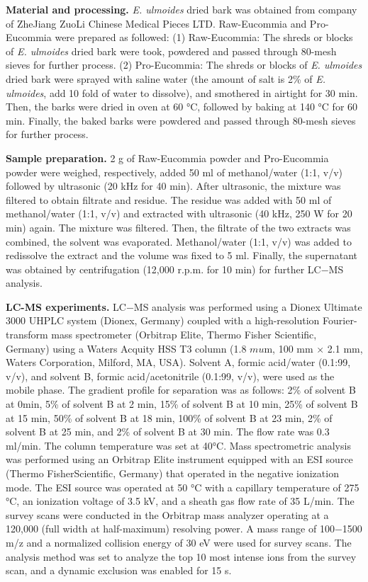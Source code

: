 \documentclass[
]{article}
\begin{document}
\textbf{Material and processing.} \emph{E. ulmoides} dried bark was
obtained from company of ZheJiang ZuoLi Chinese Medical Pieces LTD.
Raw-Eucommia and Pro-Eucommia were prepared as followed: (1)
Raw-Eucommia: The shreds or blocks of \emph{E. ulmoides} dried bark were
took, powdered and passed through 80-mesh sieves for further process.
(2) Pro-Eucommia: The shreds or blocks of \emph{E. ulmoides} dried bark
were sprayed with saline water (the amount of salt is 2\% of \emph{E.
ulmoides}, add 10 fold of water to dissolve), and smothered in airtight
for 30 min. Then, the barks were dried in oven at 60 °C, followed by
baking at 140 °C for 60 min. Finally, the baked barks were powdered and
passed through 80-mesh sieves for further process.

\textbf{Sample preparation.} 2 g of Raw-Eucommia powder and Pro-Eucommia
powder were weighed, respectively, added 50 ml of methanol/water (1:1,
v/v) followed by ultrasonic (20 kHz for 40 min). After ultrasonic, the
mixture was filtered to obtain filtrate and residue. The residue was
added with 50 ml of methanol/water (1:1, v/v) and extracted with
ultrasonic (40 kHz, 250 W for 20 min) again. The mixture was filtered.
Then, the filtrate of the two extracts was combined, the solvent was
evaporated. Methanol/water (1:1, v/v) was added to redissolve the
extract and the volume was fixed to 5 ml. Finally, the supernatant was
obtained by centrifugation (12,000 r.p.m. for 10 min) for further LC−MS
analysis.

\textbf{LC-MS experiments.} LC−MS analysis was performed using a Dionex
Ultimate 3000 UHPLC system (Dionex, Germany) coupled with a
high-resolution Fourier-transform mass spectrometer (Orbitrap Elite,
Thermo Fisher Scientific, Germany) using a Waters Acquity HSS T3 column
(1.8 \(mu\)m, 100 mm \(\times\) 2.1 mm, Waters Corporation, Milford, MA,
USA). Solvent A, formic acid/water (0.1:99, v/v), and solvent B, formic
acid/acetonitrile (0.1:99, v/v), were used as the mobile phase. The
gradient profile for separation was as follows: 2\% of solvent B at
0min, 5\% of solvent B at 2 min, 15\% of solvent B at 10 min, 25\% of
solvent B at 15 min, 50\% of solvent B at 18 min, 100\% of solvent B at
23 min, 2\% of solvent B at 25 min, and 2\% of solvent B at 30 min. The
flow rate was 0.3 ml/min. The column temperature was set at 40°C. Mass
spectrometric analysis was performed using an Orbitrap Elite instrument
equipped with an ESI source (Thermo FisherScientific, Germany) that
operated in the negative ionization mode. The ESI source was operated at
50 °C with a capillary temperature of 275 °C, an ionization voltage of
3.5 kV, and a sheath gas flow rate of 35 L/min. The survey scans were
conducted in the Orbitrap mass analyzer operating at a 120,000 (full
width at half-maximum) resolving power. A mass range of 100−1500 m/z and
a normalized collision energy of 30 eV were used for survey scans. The
analysis method was set to analyze the top 10 most intense ions from the
survey scan, and a dynamic exclusion was enabled for 15 s.
\end{document}
